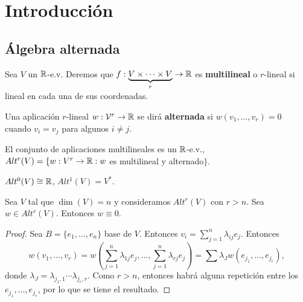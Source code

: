 \documentclass[CV.tex]{subfiles}
\begin{document}

\chapter{Introducción}
\section{Álgebra alternada}
\begin{defi}
Sea $V$ un $\mathbb{R}$-e.v. Deremos que $f:\underbrace{V\times\dots\times V}_{r}\to\mathbb{R}$ es \textbf{multilineal} o $r$-lineal si lineal en cada una de sus coordenadas.

Una aplicación $r$-lineal $w:\mathcal{V}^r\to\mathbb{R}$ se dirá \textbf{alternada} si $w(v_1,\dots, v_r)=0$ cuando $v_i=v_j$ para algunos $i\neq j$. 
\end{defi}

El conjunto de aplicaciones multilineales es un $\mathbb{R}$-e.v., $Alt^r(V)=\{w:V^r\to\mathbb{R}: w$ es multilineal y alternado$\}$. 
\begin{ej}
$Alt^0(V)\cong\mathbb{R}$, $Alt^1(V)=V^*$.
\end{ej}

\begin{lemma}
Sea $V$ tal que $\dim(V)=n$ y consideramos $Alt^r(V)$ con $r>n$. Sea $w\in Alt^r(V)$. Entonces $w\equiv 0$.
\end{lemma}
\begin{proof}
Sea $B=\{e_1,\dots, e_n\}$ base de $V$. Entonces $v_i=\sum_{j=1}^n\lambda_{ij}e_j$. Entonces
$$
w(v_1,\dots, v_r)=w\left(\sum_{j=1}^n\lambda_{1j}e_j,\dots,\sum_{j=1}^n\lambda_{rj}e_j\right)=\sum\lambda_Jw(e_{j_1},\dots, e_{j_r}),$$
donde $\lambda_J=\lambda_{j_1,1}\cdots\lambda_{j_r,r}$. Como $r>n$, entonces habrá alguna repetición entre los $e_{j_1},\dots, e_{j_r}$, por lo que se tiene el resultado.
\end{proof}
\end{document}
